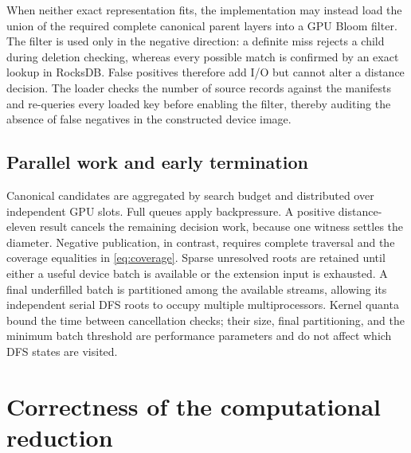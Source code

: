\documentclass[11pt]{article}
\theoremstyle{definition}
\theoremstyle{remark}
\begin{document}
When neither exact representation fits, the implementation may instead load
the union of the required complete canonical parent layers into a GPU Bloom
filter.  The filter is used only in the negative direction: a definite miss
rejects a child during deletion checking, whereas every possible match is
confirmed by an exact lookup in RocksDB.  False positives therefore add I/O
but cannot alter a distance decision.  The loader checks the number of source
records against the manifests and re-queries every loaded key before enabling
the filter, thereby auditing the absence of false negatives in the constructed
device image.

\subsection{Parallel work and early termination}

Canonical candidates are aggregated by search budget and distributed over
independent GPU slots.  Full queues apply backpressure.  A positive
distance-eleven result cancels the remaining decision work, because one
witness settles the diameter.  Negative publication, in contrast, requires
complete traversal and the coverage equalities in \eqref{eq:coverage}.
Sparse unresolved roots are retained until either a useful device batch is
available or the extension input is exhausted.  A final underfilled batch is
partitioned among the available streams, allowing its independent serial DFS
roots to occupy multiple multiprocessors.  Kernel quanta bound the time between
cancellation checks; their size, final partitioning, and the minimum batch
threshold are performance parameters and do not affect which DFS states are
visited.

\section{Correctness of the computational reduction}
\label{sec:correctness}
\end{document}
